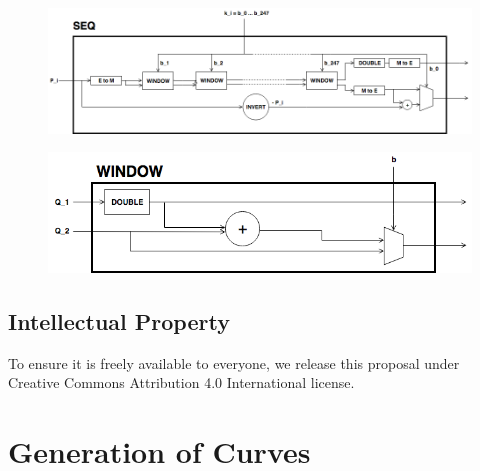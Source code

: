 \documentclass{article}
\theoremstyle{definition}
\theoremstyle{remark}
\begin{document}
\begin{spacing}{1.2}
\begin{multicols}{2}
\end{multicols}
\begin{figure}[h]
	\centering
	\includegraphics[scale=0.5]{figures/multiplication-SEQ.png}\\
	\vspace{1cm}
	
	\includegraphics[scale=0.5]{figures/multiplication-SEQ-window.png}
	\vspace{0.3cm}
\end{figure}

\vspace{0.4cm}
\begin{multicols}{2}
\section {Intellectual Property}

To ensure it is freely available to everyone, we release this proposal under Creative Commons Attribution 4.0 International license. 

	

\end{multicols}	

\newpage
\appendix

\section{Generation of Curves} \label{ap-gen}
\vspace{0.2cm}

\vspace{0.4cm}


\end{spacing}
\end{document}
